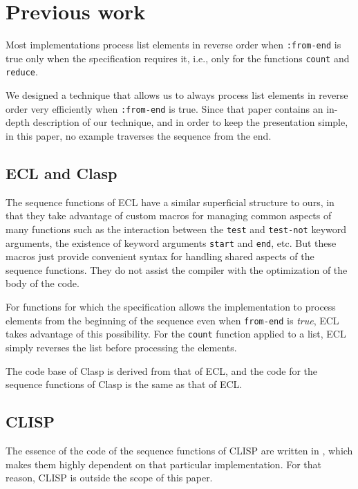\section{Previous work}

Most implementations process list elements in reverse order when
\texttt{:from-end} is true only when the specification requires it,
i.e., only for the functions \texttt{count} and \texttt{reduce}.

We designed a technique \cite{Durand:2015:ELS:reverse} that allows us
to always process list elements in reverse order very efficiently when
\texttt{:from-end} is true.  Since that paper contains an in-depth
description of our technique, and in order to keep the presentation
simple, in this paper, no example traverses the sequence from the
end.

\subsection{ECL and Clasp}

The sequence functions of ECL have a similar superficial structure to
ours, in that they take advantage of custom macros for managing common
aspects of many functions such as the interaction between the
\texttt{test} and \texttt{test-not} keyword arguments, the existence
of keyword arguments \texttt{start} and \texttt{end}, etc.
But these macros just provide convenient syntax for handling shared
aspects of the sequence functions.  They do not assist the compiler
with the optimization of the body of the code.

For functions for which the \commonlisp{} specification allows the
implementation to process elements from the beginning of the sequence
even when \texttt{from-end} is \emph{true}, ECL takes advantage of
this possibility.  For the \texttt{count} function applied to a list,
ECL simply reverses the list before processing the elements.

The \commonlisp{} code base of Clasp is derived from that of ECL, and
the code for the sequence functions of Clasp is the same as that of
ECL.

\subsection{CLISP}

The essence of the code of the sequence functions of CLISP are written
in \clanguage{}, which makes them highly dependent on that particular
implementation.  For that reason, CLISP is outside the scope of this
paper.

